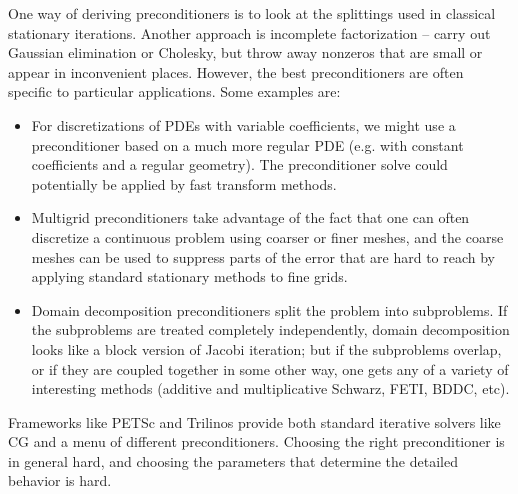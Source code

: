 \documentclass[12pt, leqno]{article}
\begin{document}
One way of deriving preconditioners is to look at the splittings used
in classical stationary iterations.  Another approach is incomplete
factorization -- carry out Gaussian elimination or Cholesky, but
throw away nonzeros that are small or appear in inconvenient places.
However, the best preconditioners are often specific to particular
applications.  Some examples are:
\begin{itemize}
\item
  For discretizations of PDEs with variable coefficients, we might use
  a preconditioner based on a much more regular PDE (e.g. with
  constant coefficients and a regular geometry).  The preconditioner
  solve could potentially be applied by fast transform methods.
\item
  Multigrid preconditioners take advantage of the fact that one can
  often discretize a continuous problem using coarser or finer meshes,
  and the coarse meshes can be used to suppress parts of the error
  that are hard to reach by applying standard stationary methods to
  fine grids.
\item
  Domain decomposition preconditioners split the problem into
  subproblems.  If the subproblems are treated completely
  independently, domain decomposition looks like a block version of
  Jacobi iteration; but if the subproblems overlap, or if they are
  coupled together in some other way, one gets any of a variety of
  interesting methods (additive and multiplicative Schwarz, FETI,
  BDDC, etc).
\end{itemize}
Frameworks like PETSc and Trilinos provide both standard iterative
solvers like CG and a menu of different preconditioners.  Choosing the
right preconditioner is in general hard, and choosing the parameters
that determine the detailed behavior is hard.
\end{document}
